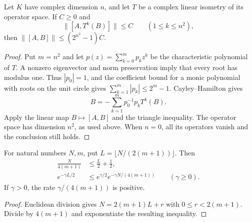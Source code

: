 \begin{lemma}
    \label{thm:hastings_finite_translation_commutator}
    \leanok
    Let $K$ have complex dimension $n$, and let $T$ be a complex linear
    isometry of its operator space. If $C\ge0$ and
    \[
        \|[A,T^k(B)]\|\le C\qquad(1\le k\le n^2),
    \]
    then $\|[A,B]\|\le(2^{n^2}-1)C$.
\end{lemma}
\begin{proof}\leanok
    Put $m=n^2$ and let $p(z)=\sum_{k=0}^m p_kz^k$ be the
    characteristic polynomial of $T$. A nonzero eigenvector and norm
    preservation imply that every root has modulus one. Thus
    $|p_0|=1$, and the coefficient bound for a monic polynomial with
    roots on the unit circle gives
    $\sum_{k=1}^m|p_k|\le2^m-1$.
    Cayley--Hamilton gives
    \[
        B=-\sum_{k=1}^m p_0^{-1}p_k T^k(B).
    \]
    Apply the linear map $B\mapsto[A,B]$ and the triangle inequality.
    The operator space has dimension $n^2$, as used above. When
    $n=0$, all its operators vanish and the conclusion still holds.
\end{proof}

\begin{lemma}
    \label{lem:hastings_translation_floor_decay}
    \leanok
    For natural numbers $N,m$, put $L=\lfloor N/(2(m+1))\rfloor$.
    Then
    \begin{align}
        \frac{N}{4(m+1)} & \le\frac L2+\frac12, \\
        e^{-\gamma L/2}  & \le e^{\gamma/2}
        e^{-\gamma N/(4(m+1))}\qquad(\gamma\ge0).
        \label{eq:hastings_translation_floor_decay}
    \end{align}
    If $\gamma>0$, the rate $\gamma/(4(m+1))$ is positive.
\end{lemma}
\begin{proof}\leanok
    Euclidean division gives $N=2(m+1)L+r$ with $0\le r<2(m+1)$.
    Divide by $4(m+1)$ and exponentiate the resulting inequality.
\end{proof}

